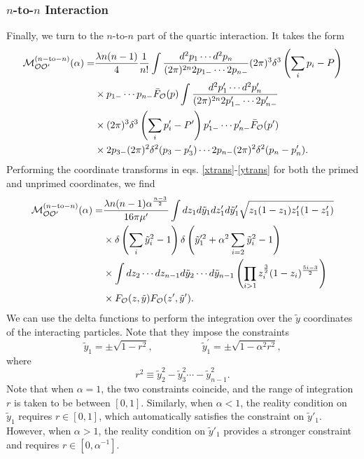 \begin{subappendices}
\subsubsection{$n$-to-$n$ Interaction} 
Finally, we turn to the $n$-to-$n$ part of the quartic interaction. It takes the 
form 
\begin{equation}
    \begin{aligned}
        {\cal M}_{{\cal O} {\cal O}'}^{(n-\textrm{to}-n)}(\alpha) = &\frac{\lambda n(n-1)}{4} \frac{1}{n!} \int \frac{d^2p_1 \dotsb d^2 p_n}{(2\pi)^{2n} 2p_{1-} \dotsb 2p_{n-}} (2\pi)^3 \delta^3\left(\sum_i p_i - P \right) \\
        &\times p_{1-} \dotsb p_{n-} \bar{F}_{{\cal O}}(p) \int \frac{d^2 p'_1 \dotsb d^2 p'_n}{(2\pi)^{2n} 2p'_{1-} \dotsb 2p'_{n-}} \\
        &\times (2\pi)^3 \delta^3\left(\sum_i p'_i - P' \right) p'_{1-} \dotsb p'_{n-} \bar{F}_{{\cal O}}(p') \\
        &\times 2p_{3-}(2\pi)^2 \delta^2(p_3 - p_3') \dotsb 2p_{n-} (2\pi)^2 \delta^2(p_n -p'_n).
    \end{aligned}
\end{equation} 
Performing the coordinate transforms in eqs. \eqref{xtrans}-\eqref{ytrans} for 
both the primed and unprimed coordinates, we find 
\begin{equation}
    \begin{aligned}
        {\cal M}_{{\cal O} {\cal O}'}^{(n-\textrm{to}-n)}(\alpha) =& \frac{\lambda n(n-1) \alpha^{\frac{n-3}{2}}}{16 \pi \mu'} \int dz_1  d\tilde{y}_1 dz'_1 d\tilde{y}'_1 \sqrt{z_1 (1-z_1) z'_1 (1-z'_1)} \\
        &\times \delta\left(\sum_i \tilde{y}_i^2 - 1 \right) \delta\left({\tilde{y}_1}^{\prime 2} +  \alpha^2 \sum_{i =2}\tilde{y}_i^2  -1\right) \\
        &\times \int dz_2 \dotsb dz_{n-1} d\tilde{y}_2 \dotsb d\tilde{y}_{n-1} \left( \prod_{i>1} z_i^{\frac{3}{2}} (1-z_i)^{\frac{5i-3}{2}} \right) \\
        &\times F_{{\cal O}}(z,\tilde{y}) F_{{\cal O}}(z',\tilde{y}').
    \end{aligned}
\end{equation} 
We can use the delta functions to perform the integration over the $\tilde{y}$ 
coordinates of the interacting particles. Note that they impose the constraints 
\begin{equation}
    \tilde{y}_1 = \pm\sqrt{1-r^2}, \quad\quad\quad\quad\quad \tilde{y}_1^{\prime} = \pm \sqrt{ 1 - \alpha^2 r^2},
\end{equation} 
where 
\begin{equation}
    r^2 \equiv \tilde{y}_2^2 - \tilde{y}_3^2 \dotsb - \tilde{y}_{n-1}^2.
\end{equation} 
Note that when $\alpha =1$, the two constraints coincide, and the range of 
integration $r$ is taken to be between $[0,1]$. Similarly, when $\alpha < 1 $, 
the reality condition on $\tilde{y}_1$ requires $r \in [0,1]$, which 
automatically satisfies the constraint on $\tilde{y}'_1$. However, when 
$\alpha > 1$, the reality condition on $\tilde{y}'_1$ provides a stronger 
constraint and requires $r \in [0, \alpha^{-1} ]$.


\end{subappendices}
